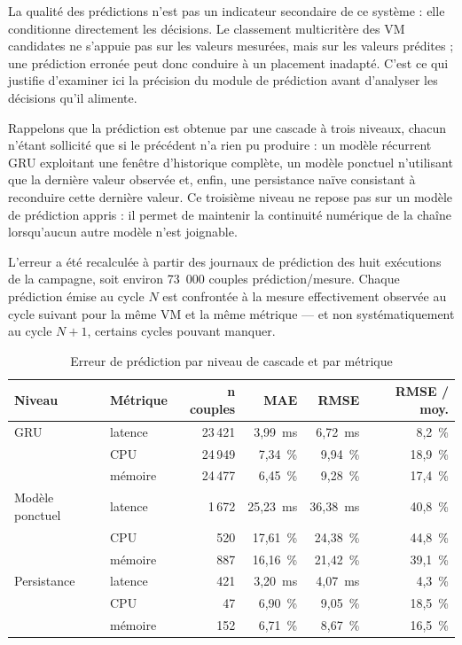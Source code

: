La qualité des prédictions n'est pas un indicateur secondaire de ce système : elle conditionne directement les décisions. Le classement multicritère des VM candidates ne s'appuie pas sur les valeurs mesurées, mais sur les valeurs prédites ; une prédiction erronée peut donc conduire à un placement inadapté. C'est ce qui justifie d'examiner ici la précision du module de prédiction avant d'analyser les décisions qu'il alimente.

Rappelons que la prédiction est obtenue par une cascade à trois niveaux, chacun n'étant sollicité que si le précédent n'a rien pu produire : un modèle récurrent GRU exploitant une fenêtre d'historique complète, un modèle ponctuel n'utilisant que la dernière valeur observée et, enfin, une persistance naïve consistant à reconduire cette dernière valeur. Ce troisième niveau ne repose pas sur un modèle de prédiction appris : il permet de maintenir la continuité numérique de la chaîne lorsqu'aucun autre modèle n'est joignable.

L'erreur a été recalculée à partir des journaux de prédiction des huit exécutions de la campagne, soit environ 73~000 couples prédiction/mesure. Chaque prédiction émise au cycle $N$ est confrontée à la mesure effectivement observée au cycle suivant pour la même VM et la même métrique — et non systématiquement au cycle $N+1$, certains cycles pouvant manquer.

\begin{table}[H]
    \centering
    \caption{Erreur de prédiction par niveau de cascade et par métrique}
    \label{tab:erreur-prediction}
    \begin{tabular}{llrrrr}
        \toprule
        \textbf{Niveau} & \textbf{Métrique} & \textbf{n couples} & \textbf{MAE} & \textbf{RMSE} & \textbf{RMSE / moy.} \\
        \midrule
        GRU              & latence & 23\,421 & 3,99~ms  & 6,72~ms  & 8,2~\%  \\
                         & CPU     & 24\,949 & 7,34~\%  & 9,94~\%  & 18,9~\% \\
                         & mémoire & 24\,477 & 6,45~\%  & 9,28~\%  & 17,4~\% \\
        \addlinespace
        Modèle ponctuel  & latence & 1\,672  & 25,23~ms & 36,38~ms & 40,8~\% \\
                         & CPU     & 520     & 17,61~\% & 24,38~\% & 44,8~\% \\
                         & mémoire & 887     & 16,16~\% & 21,42~\% & 39,1~\% \\
        \addlinespace
        Persistance      & latence & 421     & 3,20~ms  & 4,07~ms  & 4,3~\%  \\
                         & CPU     & 47      & 6,90~\%  & 9,05~\%  & 18,5~\% \\
                         & mémoire & 152     & 6,71~\%  & 8,67~\%  & 16,5~\% \\
        \bottomrule
    \end{tabular}
\end{table}

